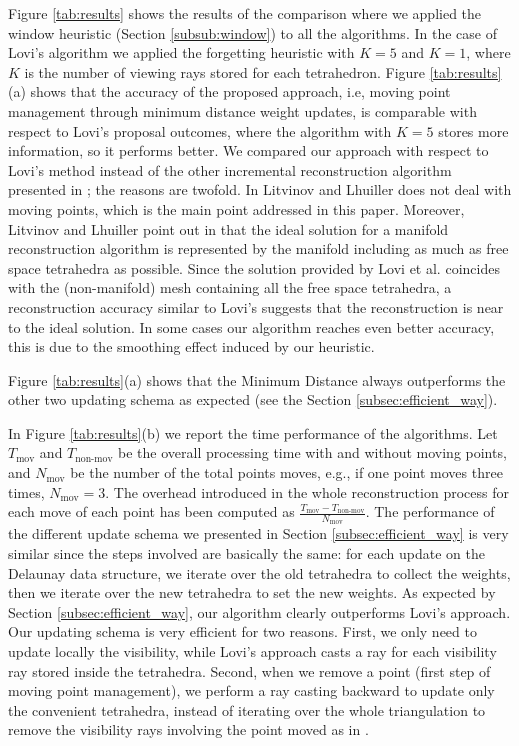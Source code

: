 Figure \ref{tab:results} shows the results of the comparison where we applied the window heuristic (Section \ref{subsub:window}) to all the algorithms. In the case of Lovi's algorithm we applied the forgetting heuristic with $K=5$ and $K=1$, where $K$ is the number of viewing rays stored for each tetrahedron.
Figure  \ref{tab:results}(a) shows that the accuracy of the proposed approach, i.e, moving point management through minimum distance weight updates, is comparable with respect to Lovi's proposal outcomes, where the algorithm with $K=5$ stores more information, so it performs better.
We compared our approach with respect to Lovi's method instead of the other incremental reconstruction algorithm presented in \cite{litvinov_lhuillier_13}; the reasons are twofold. 
In \cite{litvinov_lhuillier_13} Litvinov and Lhuiller does not deal with moving points, which is the main point addressed in this paper. Moreover, Litvinov and Lhuiller point out in \cite{litvinov_Lhiuller14} that the ideal solution for a manifold reconstruction algorithm is represented by the manifold including as much as free space tetrahedra as possible. Since the solution provided by Lovi et al. coincides with the (non-manifold) mesh containing all the free space tetrahedra, a reconstruction accuracy similar to Lovi's suggests that the reconstruction is near to the ideal solution. In some cases our algorithm reaches even better accuracy, this is due to the smoothing effect induced by our heuristic.


Figure \ref{tab:results}(a) shows that the Minimum Distance always outperforms the other two updating schema as expected (see the Section \ref{subsec:efficient_way}).

In Figure \ref{tab:results}(b) we report the time performance of the algorithms.
Let $T_{\text{mov}}$ and $T_{\text{non-mov}}$ be the overall processing time with and without moving points, and $N_{\text{mov}}$ be the number of the total points moves, e.g., if one point moves three times, $N_{\text{mov}}=3$.
The overhead introduced in the whole reconstruction process for each move of each point has been computed as $\frac{T_{\text{mov}} - T_{\text{non-mov}}}{N_{\text{mov}}}$.
The performance of the different update schema we presented in Section \ref{subsec:efficient_way} is very similar since the steps involved are basically the same: for each update on the Delaunay data structure, we iterate over the old tetrahedra to collect the weights, then we iterate over the new tetrahedra to set the new weights.
As expected by Section \ref{subsec:efficient_way}, our algorithm clearly outperforms Lovi's approach. Our updating schema is very efficient for two reasons. 
First, we only need to update locally the visibility, while Lovi's approach casts a ray for each visibility ray stored inside the tetrahedra.
Second, when we remove a point (first step of moving point management), we perform a ray casting backward to update only the convenient tetrahedra,  instead of iterating over the whole triangulation to remove the visibility rays involving the point moved as in \cite{lovi_et_al_11}.
  

